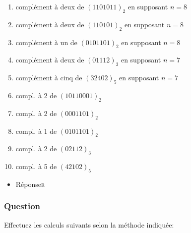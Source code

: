 \documentclass[11pt]{article}
\begin{document}
\begin{enumerate}
\item complément à deux de \((1101011)_2\) en supposant \(n=8\)

\item complément à deux de \((110101)_2\) en supposant \(n=8\)

\item complément à un de \((0101101)_2\) en supposant \(n=8\)

\item complément à deux de \((01112)_3\) en supposant \(n=7\)

\item complément à cinq de \((32402)_5\) en supposant \(n=7\)

\item compl. à 2 de \((10110001)_2\)

\item compl. à 2 de \((0001101)_2\)

\item compl. à 1 de \((0101101)_2\)

\item compl. à 2 de \((02112)_3\)

\item compl. à 5 de \((42102)_5\)
\end{enumerate}

\begin{itemize}
\item Réponse\hfill{}\textsc{r}
\label{sec:orgc761564}
\end{itemize}

\subsubsection*{Question}
\label{sec:orgad15728}
Effectuez les calculs suivants selon la méthode indiquée:
\end{document}
